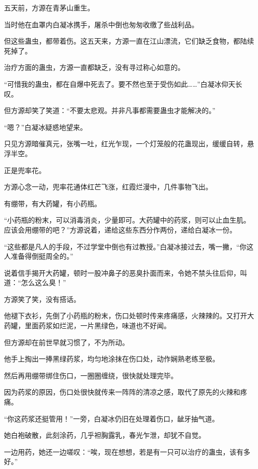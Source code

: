 
\begin{this_body}



五天前，方源在青茅山重生。

当时他在血罩内白凝冰携手，屠杀中倒也匆匆收缴了些战利品。

但这些蛊虫，都带着伤。这五天来，方源一直在江山漂流，它们缺乏食物，都陆续死掉了。

治疗方面的蛊虫，方源一直都缺乏，没有寻过称心如意的。

“可惜我的蛊虫，都在自爆中死去了。要不然也至于受伤如此……”白凝冰仰天长叹。

但方源却笑了笑道：“不要太悲观。并非凡事都需要蛊虫才能解决的。”

“嗯？”白凝冰疑惑地望来。

只见方源暗催真元，张嘴一吐，红光乍现，一个灯笼般的花蛊现出，缓缓自转，悬浮半空。

正是兜率花。

方源心念一动，兜率花通体红芒飞涨，红霞烂漫中，几件事物飞出。

有绷带，有大药罐，有小药瓶。

“小药瓶的粉末，可以消毒消炎，少量即可。大药罐中的药浆，则可以止血生肌。应该会用绷带的吧？”方源说着，递给这些东西分作两份，递给白凝冰一份。

“这些都是凡人的手段，不过学堂中倒也有过教授。”白凝冰接过去，嘴一撇，“你这人准备得倒挺周全的。”

说着信手揭开大药罐，顿时一股冲鼻子的恶臭扑面而来，令她不禁头往后仰，叫道：“怎么这么臭！”

方源笑了笑，没有搭话。

他褪下衣衫，先倒了小药瓶的粉末，伤口处顿时传来疼痛感，火辣辣的。又打开大药罐，里面药浆如烂泥，一片黑绿色，味道也不好闻。

但方源却在前世早就习惯了，不为所动。

他手上掏出一捧黑绿药浆，均匀地涂抹在伤口处，动作娴熟老练至极。

然后再用绷带绑住伤口，一圈圈缠绕，很快就处理完毕。

因为药浆的原因，伤口处很快就传来一阵阵的清凉之感，取代了原先的火辣和疼痛。

“你这药浆还挺管用！”一旁，白凝冰仍旧在处理着伤口，龇牙抽气道。

她白袍破散，此刻涂药，几乎袒胸露乳，春光乍泄，却犹不自觉。

一边用药，她还一边嗟叹：“唉，现在想想，若是有一只可以治疗的蛊虫，该有多好。”


\end{this_body}
